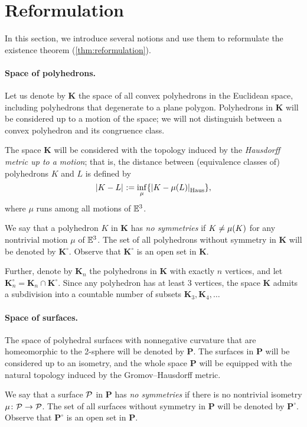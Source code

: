 \section{Reformulation}

In this section, we introduce several notions and use them to reformulate the existence theorem (\ref{thm:reformulation}).

\paragraph{Space of polyhedrons.}
Let us denote by $\bm{K}$ the space of all convex polyhedrons in the Euclidean space,
including polyhedrons that degenerate to a plane polygon.
Polyhedrons in $\bm{K}$ will be considered up to a motion of the space; we will not distinguish between a convex polyhedron and its congruence class.

The space $\bm{K}$ will be considered with the topology induced by the {}\emph{Hausdorff metric up to a motion};
that is, the distance between (equivalence classes of) polyhedrons $K$ and $L$ is defined by
\[|{K}-{L}|_{}^{{}}\mathrel{:=} \inf_\mu \{|{K}-{\mu(L)}|_{\operatorname{\rm Haus}\nolimits}^{{}}\},\]
where $\mu$ runs among all motions of $\mathbb{E}^3$.

We say that a polyhedron $K$ in $\bm{K}$ has \emph{no symmetries} if  $K\ne \mu(K)$ for any nontrivial motion $\mu$ of $\mathbb{E}^3$.
The set of all polyhedrons without symmetry in $\bm{K}$ will be denoted by $\bm{K}^\circ$.
Observe that $\bm{K}^\circ$ is an open set in $\bm{K}$.

Further, denote by $\bm{K}_n$ the polyhedrons in $\bm{K}$ with exactly $n$ vertices, and let $\bm{K}_n^\circ=\bm{K}_n\cap \bm{K}^\circ$.
Since any polyhedron has at least 3 vertices, the space $\bm{K}$ admits a subdivision into a countable number of subsets $\bm{K}_3,\bm{K}_4,\dots$

\paragraph{Space of surfaces.}
The space of polyhedral surfaces with nonnegative curvature that are homeomorphic to the 2-sphere will be denoted by $\bm{P}$.
The surfaces in $\bm{P}$ will be considered up to an isometry, and the whole space $\bm{P}$ will be equipped with the natural topology induced by the Gromov--Hausdorff metric.

We say that a surface $\mathcal{P}$ in $\bm{P}$ has \emph{no symmetries} if there is no nontrivial isometry
$\mu\colon\mathcal{P}\to \mathcal{P}$.
The set of all surfaces without symmetry in $\bm{P}$ will be denoted by $\bm{P}^\circ$.
Observe that $\bm{P}^\circ$ is an open set in $\bm{P}$.

